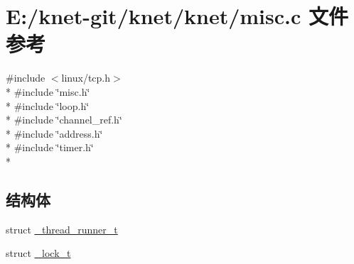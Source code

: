 \hypertarget{a00081}{}\section{E\+:/knet-\/git/knet/knet/misc.c 文件参考}
\label{a00081}
{\ttfamily \#include $<$linux/tcp.\+h$>$}\\*
{\ttfamily \#include \char`\"{}misc.\+h\char`\"{}}\\*
{\ttfamily \#include \char`\"{}loop.\+h\char`\"{}}\\*
{\ttfamily \#include \char`\"{}channel\+\_\+ref.\+h\char`\"{}}\\*
{\ttfamily \#include \char`\"{}address.\+h\char`\"{}}\\*
{\ttfamily \#include \char`\"{}timer.\+h\char`\"{}}\\*
\subsection*{结构体}
\begin{DoxyCompactItemize}
\item 
struct \hyperlink{a00035}{\+\_\+thread\+\_\+runner\+\_\+t}
\item 
struct \hyperlink{a00026}{\+\_\+lock\+\_\+t}
\end{DoxyCompactItemize}
